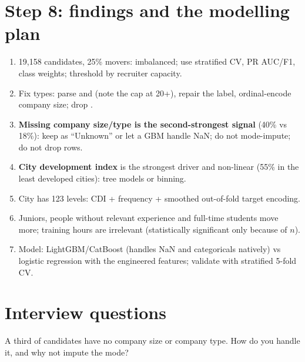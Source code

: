 \section{Step 8: findings and the modelling plan}
\begin{enumerate}
\item 19{,}158 candidates, 25\% movers: imbalanced; use stratified CV, PR AUC/F1, class weights; threshold by recruiter capacity.
\item Fix types: parse  and  (note the cap at 20+), repair the  label, ordinal-encode company size; drop .
\item \textbf{Missing company size/type is the second-strongest signal} (40\% vs 18\%): keep as ``Unknown'' or let a GBM handle NaN; do not mode-impute; do not drop rows.
\item \textbf{City development index} is the strongest driver and non-linear (55\% in the least developed cities): tree models or binning.
\item City has 123 levels: CDI + frequency + smoothed out-of-fold target encoding.
\item Juniors, people without relevant experience and full-time students move more; training hours are irrelevant (statistically significant only because of $n$).
\item Model: LightGBM/CatBoost (handles NaN and categoricals natively) vs logistic regression with the engineered features; validate with stratified 5-fold CV.
\end{enumerate}

\section{Interview questions}

\begin{qa}{\deep A third of candidates have no company size or company type. How do you handle it, and why not impute the mode?}
\end{qa}

